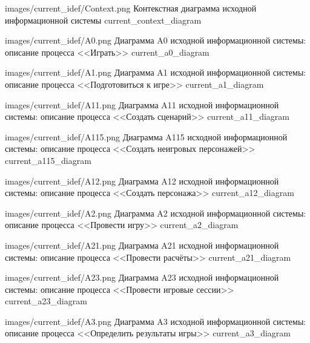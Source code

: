             {images/current_idef/Context.png}
            {Контекстная диаграмма исходной информационной системы}
            {current_context_diagram}



             {images/current_idef/A0.png}
             {Диаграмма A0 исходной информационной системы: описание процесса <<Играть>>}
             {current_a0_diagram}



             {images/current_idef/A1.png}
             {Диаграмма A1 исходной информационной системы: описание процесса <<Подготовиться к игре>>}
             {current_a1_diagram}

            {images/current_idef/A11.png}
            {Диаграмма A11 исходной информационной системы: описание процесса <<Создать сценарий>>}
            {current_a11_diagram}

            {images/current_idef/A115.png}
            {Диаграмма A115 исходной информационной системы: описание процесса <<Создать неигровых персонажей>>}
            {current_a115_diagram}

            {images/current_idef/A12.png}
            {Диаграмма A12 исходной информационной системы: описание процесса <<Создать персонажа>>}
            {current_a12_diagram}



             {images/current_idef/A2.png}
             {Диаграмма A2 исходной информационной системы: описание процесса <<Провести игру>>}
             {current_a2_diagram}

             {images/current_idef/A21.png}
             {Диаграмма A21 исходной информационной системы: описание процесса <<Провести расчёты>>}
             {current_a21_diagram}

             {images/current_idef/A23.png}
             {Диаграмма A23 исходной информационной системы: описание процесса <<Провести игровые сессии>>}
             {current_a23_diagram}



             {images/current_idef/A3.png}
             {Диаграмма A3 исходной информационной системы: описание процесса <<Определить результаты игры>>}
             {current_a3_diagram}
